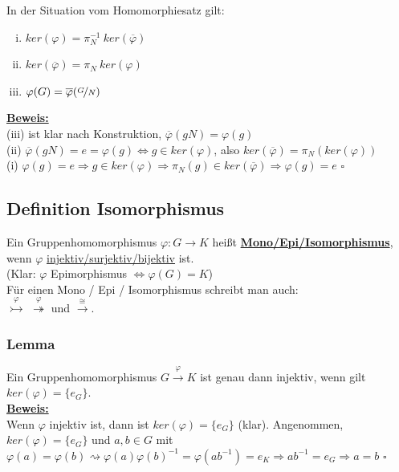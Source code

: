 \documentclass[a4paper, pagesize=pdftex, pdftex, twoside, headsepline, index=totoc,toc=listof, fontsize=10pt, cleardoublepage=empty, headinclude, DIV=13, BCOR=13mm]{scrartcl}
\newcommand{\bet}[1]{\uline{\textbf{#1}}} %
\begin{document}
In der Situation vom Homomorphiesatz gilt:
\begin{enumerate}[(i)]
	\item $ker(\varphi)=\pi_N^{-1}~ker(\overline{\varphi})$
	\item $ker(\overline{\varphi})=\pi_N~ker(\varphi)$
	\item $\varphi(G)=\overline{\varphi}(\nicefrac{G}{N})$
\end{enumerate}
\bet{Beweis:}\\
(iii) ist klar nach Konstruktion, $\overline{\varphi}(gN)=\varphi(g)$\\
(ii) $\overline{\varphi}(gN)=e=\varphi(g) \Leftrightarrow g \in ker(\varphi)$, also $ker(\overline{\varphi})=\pi_N(ker(\varphi))$\\
(i) $\varphi(g)=e \Rightarrow g \in ker(\varphi) \Rightarrow\pi_N(g) \in ker(\overline{\varphi}) \Rightarrow \varphi(g)=e$
\hfill $\square$


\subsection{Definition Isomorphismus}
\label{sub:def_isomorph}
Ein Gruppenhomomorphismus $\varphi:G \to K$ heißt \bet{Mono/Epi/Isomorphismus}, wenn $\varphi$ \uline{injektiv/surjektiv/bijektiv} ist.\\
(Klar: $\varphi$ Epimorphismus $\Leftrightarrow \varphi(G)=K$)\\
Für einen Mono / Epi / Isomorphismus schreibt man auch: \\
$\stackrel{\varphi}{\rightarrowtail}$  $\stackrel{\varphi}{\twoheadrightarrow}$  und  $\stackrel{\cong}{\to}$.

\subsubsection*{Lemma}
Ein Gruppenhomomorphismus $G \stackrel{\varphi}{\to}K$ ist genau dann injektiv, wenn gilt $ker(\varphi)=\{e_G\}$.\\

\bet{Beweis:}\\
Wenn $\varphi$ injektiv ist, dann ist $ker(\varphi)=\{e_G\}$ (klar). Angenommen, $ker(\varphi)=\{e_G\}$ und $a,b\in G$ mit $\varphi(a)=\varphi(b) \rightsquigarrow \varphi(a)\varphi(b)^{-1}=\varphi(ab^{-1})=e_K \Rightarrow ab^{-1}=e_G \Rightarrow a=b$
\hfill $\square$

\end{document}
